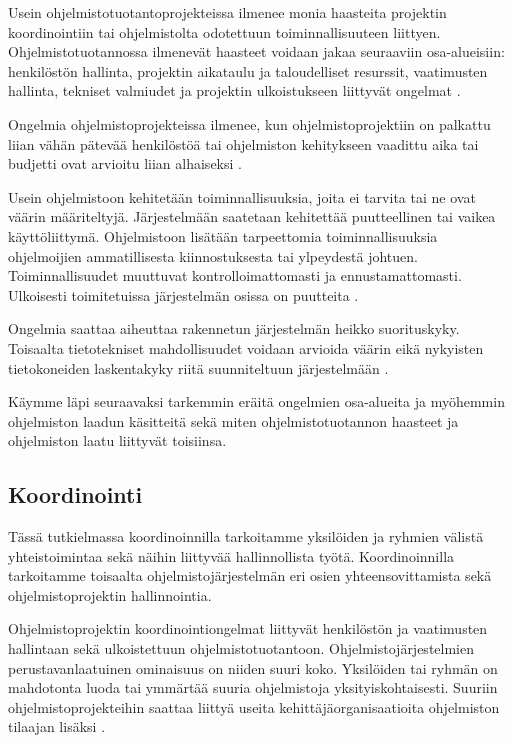 \documentclass[finnish]{tktltiki2}
\theoremstyle{definition}
\theoremstyle{remark}
\begin{document}
Usein ohjelmistotuotantoprojekteissa ilmenee monia haasteita projektin koordinointiin tai ohjelmistolta odotettuun toiminnallisuuteen liittyen. Ohjelmistotuotannossa ilmenevät haasteet voidaan jakaa seuraaviin osa-alueisiin: henkilöstön hallinta, projektin aikataulu ja taloudelliset resurssit, vaatimusten hallinta, tekniset valmiudet ja projektin ulkoistukseen liittyvät ongelmat \cite{BOE88}.

Ongelmia  ohjelmistoprojekteissa ilmenee, kun ohjelmistoprojektiin on palkattu liian vähän pätevää henkilöstöä tai ohjelmiston kehitykseen vaadittu aika tai budjetti ovat arvioitu liian alhaiseksi \cite{BOE88}. 

Usein ohjelmistoon kehitetään toiminnallisuuksia, joita ei tarvita tai ne ovat väärin määriteltyjä. Järjestelmään saatetaan kehitettää puutteellinen tai vaikea käyttöliittymä. Ohjelmistoon lisätään tarpeettomia toiminnallisuuksia ohjelmoijien ammatillisesta kiinnostuksesta tai ylpeydestä johtuen. Toiminnallisuudet muuttuvat kontrolloimattomasti ja ennustamattomasti. Ulkoisesti toimitetuissa järjestelmän osissa on puutteita \cite{BOE88}. 

Ongelmia saattaa aiheuttaa rakennetun järjestelmän heikko suorituskyky. Toisaalta tietotekniset mahdollisuudet voidaan arvioida väärin eikä nykyisten tietokoneiden laskentakyky riitä suunniteltuun järjestelmään \cite{BOE88}.

Käymme läpi seuraavaksi tarkemmin eräitä ongelmien osa-alueita ja myöhemmin ohjelmiston laadun käsitteitä sekä miten ohjelmistotuotannon haasteet ja ohjelmiston laatu liittyvät toisiinsa. 

\subsection{Koordinointi}

Tässä tutkielmassa koordinoinnilla tarkoitamme yksilöiden ja ryhmien välistä yhteistoimintaa sekä näihin liittyvää hallinnollista työtä. Koordinoinnilla tarkoitamme toisaalta ohjelmistojärjestelmän eri osien yhteensovittamista sekä ohjelmistoprojektin hallinnointia.

Ohjelmistoprojektin koordinointiongelmat liittyvät henkilöstön ja vaatimusten hallintaan sekä ulkoistettuun ohjelmistotuotantoon. Ohjelmisto\-järjestelmien perustavanlaatuinen ominaisuus on niiden suuri koko. Yksilöiden tai ryhmän on mahdotonta luoda tai ymmärtää suuria ohjelmistoja yksityiskohtaisesti. Suuriin ohjelmistoprojekteihin saattaa liittyä useita kehittäjä\-organisaatioita ohjelmiston tilaajan lisäksi \cite{KES95}. 
\end{document}

